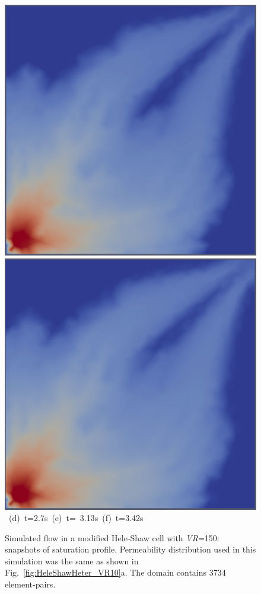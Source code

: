 \begin{landscape}
\begin{figure}[ht]
{{            \includegraphics[width=.45\textwidth]{./Pics1/Saffman_new/ST_Heterog_1800.pdf}
            \includegraphics[width=.45\textwidth]{./Pics1/Saffman_new/ST_Heterog_2180.pdf} }
      \hbox{\hspace{3.cm} (d) t=2.7s \hspace{3.cm} (e) t= 3.13s\hspace{4.cm} (f) t=3.42s }}
\caption{Simulated flow in a modified Hele-Shaw cell with {\it VR}=150: snapshots of saturation profile. Permeability distribution used in this simulation was the same as shown in Fig.~\ref{fig:HeleShawHeter_VR10}a. The domain contains 3734  element-pairs.}
\label{fig:HeleShawHeter_VR150_coarse}
\end{figure}
\end{landscape}
\clearpage



